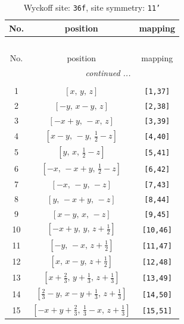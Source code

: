 \documentclass[fleqn,8pt]{jsarticle}
\begin{document}
\renewcommand{\arraystretch}{1.2}
\begin{longtable}{ccc}
\caption{Wyckoff site: {\tt 36f}, site symmetry: {\tt 11'}}
 \\
 \hline \hline
No. & position & mapping \\ \hline \endfirsthead

\multicolumn{2}{l}{\tablename\ \thetable{}} \\
 \hline \hline
No. & position & mapping \\ \hline \endhead

 \hline \hline
\multicolumn{2}{r}{\footnotesize\it continued ...} \\ \endfoot

 \hline \hline
\multicolumn{2}{r}{} \\ \endlastfoot

1 & $\left[ x,\, y,\, z \right]$ & {\tt [1,37]} \\ \hline
2 & $\left[ - y,\, x - y,\, z \right]$ & {\tt [2,38]} \\ \hline
3 & $\left[ - x + y,\, - x,\, z \right]$ & {\tt [3,39]} \\ \hline
4 & $\left[ x - y,\, - y,\, \frac{1}{2} - z \right]$ & {\tt [4,40]} \\ \hline
5 & $\left[ y,\, x,\, \frac{1}{2} - z \right]$ & {\tt [5,41]} \\ \hline
6 & $\left[ - x,\, - x + y,\, \frac{1}{2} - z \right]$ & {\tt [6,42]} \\ \hline
7 & $\left[ - x,\, - y,\, - z \right]$ & {\tt [7,43]} \\ \hline
8 & $\left[ y,\, - x + y,\, - z \right]$ & {\tt [8,44]} \\ \hline
9 & $\left[ x - y,\, x,\, - z \right]$ & {\tt [9,45]} \\ \hline
10 & $\left[ - x + y,\, y,\, z + \frac{1}{2} \right]$ & {\tt [10,46]} \\ \hline
11 & $\left[ - y,\, - x,\, z + \frac{1}{2} \right]$ & {\tt [11,47]} \\ \hline
12 & $\left[ x,\, x - y,\, z + \frac{1}{2} \right]$ & {\tt [12,48]} \\ \hline
13 & $\left[ x + \frac{2}{3},\, y + \frac{1}{3},\, z + \frac{1}{3} \right]$ & {\tt [13,49]} \\ \hline
14 & $\left[ \frac{2}{3} - y,\, x - y + \frac{1}{3},\, z + \frac{1}{3} \right]$ & {\tt [14,50]} \\ \hline
15 & $\left[ - x + y + \frac{2}{3},\, \frac{1}{3} - x,\, z + \frac{1}{3} \right]$ & {\tt [15,51]} \\ \hline

\end{longtable}
\end{document}
